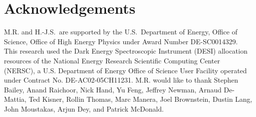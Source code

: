 \documentclass[fleqn, usenatbib]{mnras}
\begin{document}

\section*{Acknowledgements}
M.R. and H.-J.S.~are supported by the U.S.~Department of Energy, Office of Science, Office of High Energy Physics under Award Number DE-SC0014329. This research used the Dark Energy Spectroscopic Instrument (DESI) allocation resources of the National Energy Research Scientific Computing Center (NERSC), a U.S. Department of Energy Office of Science User Facility operated under Contract No. DE-AC02-05CH11231. M.R. would like to thank Stephen Bailey, Anand Raichoor, Nick Hand, Yu Feng, Jeffrey Newman, Arnaud De-Mattia, Ted Kisner, Rollin Thomas, Marc Manera, Joel Brownstein, Dustin Lang, John Moustakas, Arjun Dey, and Patrick McDonald. 









\newpage
\appendix



\bsp	%
\label{lastpage}
\end{document}

